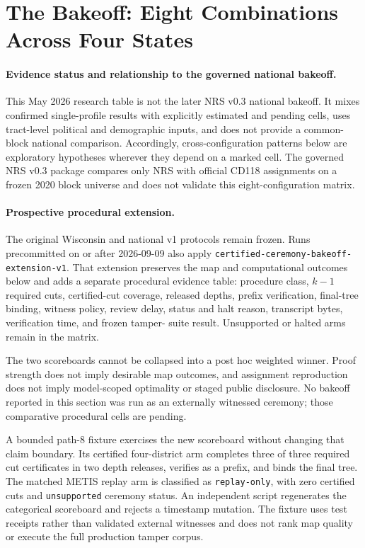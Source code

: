 \section{The Bakeoff: Eight Combinations Across Four States}
\label{sec:bakeoff}

\paragraph{Evidence status and relationship to the governed national bakeoff.}
This May 2026 research table is not the later NRS v0.3 national bakeoff. It
mixes confirmed single-profile results with explicitly estimated and pending
cells, uses tract-level political and demographic inputs, and does not provide
a common-block national comparison. Accordingly, cross-configuration patterns
below are exploratory hypotheses wherever they depend on a marked cell. The
governed NRS v0.3 package compares only NRS with official CD118 assignments on
a frozen 2020 block universe and does not validate this eight-configuration
matrix.

\paragraph{Prospective procedural extension.}
The original Wisconsin and national v1 protocols remain frozen. Runs
precommitted on or after 2026-09-09 also apply
\texttt{certified-ceremony-bakeoff-extension-v1}. That extension preserves the
map and computational outcomes below and adds a separate procedural evidence
table: procedure class, $k-1$ required cuts, certified-cut coverage, released
depths, prefix verification, final-tree binding, witness policy, review delay,
status and halt reason, transcript bytes, verification time, and frozen tamper-
suite result. Unsupported or halted arms remain in the matrix.

The two scoreboards cannot be collapsed into a post hoc weighted winner. Proof
strength does not imply desirable map outcomes, and assignment reproduction
does not imply model-scoped optimality or staged public disclosure. No bakeoff
reported in this section was run as an externally witnessed ceremony; those
comparative procedural cells are pending.

A bounded path-8 fixture exercises the new scoreboard without changing that
claim boundary. Its certified four-district arm completes three of three
required cut certificates in two depth releases, verifies as a prefix, and
binds the final tree. The matched METIS replay arm is classified as
\texttt{replay-only}, with zero certified cuts and \texttt{unsupported}
ceremony status. An independent script regenerates the categorical scoreboard
and rejects a timestamp mutation. The fixture uses test receipts rather than
validated external witnesses and does not rank map quality or execute the full
production tamper corpus.

